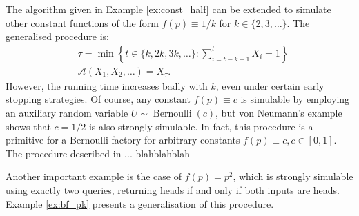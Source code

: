 \documentclass{article}
\theoremstyle{definition}
\newcommand{\Bern}{\operatorname{Bernoulli}}
\newcommand{\A}{\mathcal{A}}
\begin{document}
The algorithm given in Example \ref{ex:const_half} can be extended to simulate other constant functions of the form $f(p)\equiv 1/k$ for $k\in \{2,3,\dots\}$. The generalised procedure is:
\begin{align*}
& \tau = \min\left\{ t \in \{k,2k,3k,\dots\} : \sum_{i=t-k+1}^t X_{i} = 1 \right\} \\
& \A(X_1,X_2,\dots) = X_\tau.
\end{align*}
However, the running time increases badly with $k$, even under certain early stopping strategies.
Of course, any constant $f(p)\equiv c$ is simulable by employing an auxiliary random variable $U\sim \Bern(c)$, but von Neumann's example shows that $c=1/2$ is also strongly simulable.
In fact, this procedure is a primitive for a Bernoulli factory for arbitrary constants $f(p)\equiv c, c\in[0,1]$. The procedure described in \citet[Proposition 13]{nacu2005} ... blahblahblah

Another important example is the case of $f(p)=p^2$, which is strongly simulable using exactly two queries, returning heads if and only if both inputs are heads. Example \ref{ex:bf_pk} presents a generalisation of this procedure.
\end{document}
